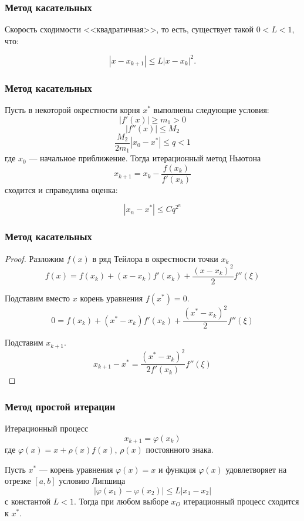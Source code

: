 \documentclass[10pt]{beamer}
\begin{document}
\begin{frame}[fragile]
\frametitle{Метод касательных}

Скорость сходимости <<квадратичная>>, то есть, существует такой $0 < L < 1$, что:

$$|x - x_{k+1}| \le L |x - x_{k}|^2.$$

\end{frame}

\begin{frame}[fragile]
\frametitle{Метод касательных}

\begin{theorem}
Пусть в некоторой окрестности корня $x^*$ выполнены следующие условия:
$$ |f'(x)| \geqslant m_1 > 0$$
$$ |f''(x)| \leqslant M_2$$
$$ \frac{M_2}{2 m_1} |x_0 - x^*| \leqslant q < 1$$
где $x_0$ --- начальное приближение. Тогда итерационный метод Ньютона
$$x_{k+1} = x_k - \frac{f(x_k)}{f'(x_k)}$$
сходится и справедлива оценка:

$$|x_n - x^*| \le C q^{2^n}$$
\end{theorem}
\end{frame}


\begin{frame}[fragile]
\frametitle{Метод касательных}

\begin{proof}
Разложим $f(x)$ в ряд Тейлора в окрестности точки $x_k$
$$f(x) = f(x_k) + (x - x_k) f'(x_k) + \frac{(x - x_k)^2}{2} f''(\xi)$$

Подставим вместо $x$ корень уравнения $f(x^*) = 0$.
$$0 = f(x_k) + (x^* - x_k) f'(x_k) + \frac{(x^* - x_k)^2}{2} f''(\xi)$$

Подставим $x_{k+1}$.
$$x_{k+1} - x^{*} = \frac{(x^* - x_k)^2}{2 f'(x_k)} f''(\xi)$$
\end{proof}
\end{frame}


\begin{frame}[fragile]
\frametitle{Метод простой итерации}
Итерационный процесс
$$x_{k+1} = \varphi(x_k) $$
где $ \varphi(x) = x + \rho(x) f(x)$, $\rho(x)$ постоянного знака.

\begin{theorem}
Пусть $x^*$ --- корень уравнения $\varphi(x) = x$ и функция  
$\varphi(x)$ удовлетворяет на отрезке $[a, b]$ условию Липшица 
$$ |\varphi(x_1) - \varphi(x_2)| \leqslant L |x_1 - x_2| $$
с константой $L < 1$. Тогда при любом выборе $x_O$ итерационный процесс сходится к $x^*$.
\end{theorem}

\end{frame}
\end{document}
